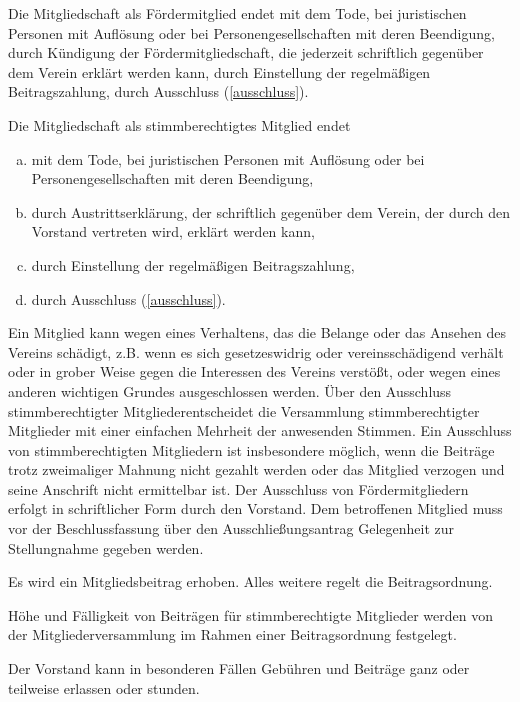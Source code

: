\begin{contract}

    Die Mitgliedschaft als Fördermitglied endet
    mit dem Tode, bei juristischen Personen mit Auflösung oder bei Personengesellschaften mit deren Beendigung,
    durch Kündigung der Fördermitgliedschaft, die jederzeit schriftlich gegenüber dem Verein erklärt werden kann,
    durch Einstellung der regelmäßigen Beitragszahlung,
    durch Ausschluss (\ref{ausschluss}).

    Die Mitgliedschaft als stimmberechtigtes Mitglied endet
    \begin{enumerate}[(a)]
        \item mit dem Tode, bei juristischen Personen mit Auflösung oder bei Personengesellschaften mit deren Beendigung,
        \item durch Austrittserklärung, der schriftlich gegenüber dem Verein, der durch den Vorstand vertreten wird, erklärt werden kann,
        \item durch Einstellung der regelmäßigen Beitragszahlung,
        \item durch Ausschluss (\ref{ausschluss}).
    \end{enumerate}

    Ein Mitglied kann wegen eines Verhaltens, das die Belange oder das Ansehen des Vereins schädigt, z.B. wenn es sich gesetzeswidrig oder vereinsschädigend verhält oder in grober Weise gegen die Interessen des Vereins verstößt, oder wegen eines anderen wichtigen Grundes ausgeschlossen werden. Über den Ausschluss stimmberechtigter Mitgliederentscheidet die Versammlung stimmberechtigter Mitglieder mit einer einfachen Mehrheit der anwesenden Stimmen. Ein Ausschluss von stimmberechtigten Mitgliedern ist insbesondere möglich, wenn die Beiträge trotz zweimaliger Mahnung nicht gezahlt werden oder das Mitglied verzogen und seine Anschrift nicht ermittelbar ist. Der Ausschluss von Fördermitgliedern erfolgt in schriftlicher Form durch den Vorstand. Dem betroffenen Mitglied muss vor der Beschlussfassung über den Ausschließungsantrag Gelegenheit zur Stellungnahme gegeben werden.
    \label{ausschluss}

    Es wird ein Mitgliedsbeitrag erhoben. Alles weitere regelt die Beitragsordnung.

    Höhe und Fälligkeit von Beiträgen für stimmberechtigte Mitglieder werden von der Mitgliederversammlung im Rahmen einer Beitragsordnung festgelegt.

    Der Vorstand kann in besonderen Fällen Gebühren und Beiträge ganz oder teilweise erlassen oder stunden.

\end{contract}

